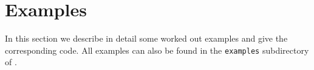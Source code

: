 \section{Examples}
In this section we describe in detail some worked out examples and
give the corresponding code. All examples can also be found in the
{\texttt{examples}} subdirectory of \mpspack.
